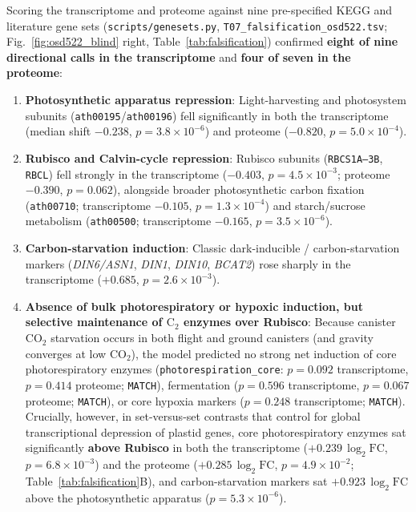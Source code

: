 \documentclass[preprint,11pt,numbers,sort&compress]{elsarticle}
\begin{document}
Scoring the transcriptome and proteome against nine pre-specified KEGG and literature gene sets (\texttt{scripts/genesets.py}, \texttt{T07\_falsification\_osd522.tsv}; Fig.~\ref{fig:osd522_blind} right, Table~\ref{tab:falsification}) confirmed \textbf{eight of nine directional calls in the transcriptome} and \textbf{four of seven in the proteome}:
\begin{enumerate}
    \item \textbf{Photosynthetic apparatus repression}: Light-harvesting and photosystem subunits (\texttt{ath00195}/\texttt{ath00196}) fell significantly in both the transcriptome (median shift $-0.238$, $p = 3.8\times 10^{-6}$) and proteome ($-0.820$, $p = 5.0\times 10^{-4}$).
    \item \textbf{Rubisco and Calvin-cycle repression}: Rubisco subunits (\texttt{RBCS1A--3B}, \texttt{RBCL}) fell strongly in the transcriptome ($-0.403$, $p = 4.5\times 10^{-3}$; proteome $-0.390$, $p = 0.062$), alongside broader photosynthetic carbon fixation (\texttt{ath00710}; transcriptome $-0.105$, $p = 1.3\times 10^{-4}$) and starch/sucrose metabolism (\texttt{ath00500}; transcriptome $-0.165$, $p = 3.5\times 10^{-6}$).
    \item \textbf{Carbon-starvation induction}: Classic dark-inducible / carbon-starvation markers (\textit{DIN6/ASN1}, \textit{DIN1}, \textit{DIN10}, \textit{BCAT2}) rose sharply in the transcriptome ($+0.685$, $p = 2.6\times 10^{-3}$).
    \item \textbf{Absence of bulk photorespiratory or hypoxic induction, but selective maintenance of $\mathrm{C_2}$ enzymes over Rubisco}: Because canister $\mathrm{CO_2}$ starvation occurs in both flight and ground canisters (and gravity converges at low $\mathrm{CO_2}$), the model predicted no strong net induction of core photorespiratory enzymes (\texttt{photorespiration\_core}: $p = 0.092$ transcriptome, $p = 0.414$ proteome; \texttt{MATCH}), fermentation ($p = 0.596$ transcriptome, $p = 0.067$ proteome; \texttt{MATCH}), or core hypoxia markers ($p = 0.248$ transcriptome; \texttt{MATCH}). Crucially, however, in set-versus-set contrasts that control for global transcriptional depression of plastid genes, core photorespiratory enzymes sat significantly \textbf{above Rubisco} in both the transcriptome ($+0.239\,\log_2\mathrm{FC}$, $p = 6.8\times 10^{-3}$) and the proteome ($+0.285\,\log_2\mathrm{FC}$, $p = 4.9\times 10^{-2}$; Table~\ref{tab:falsification}B), and carbon-starvation markers sat $+0.923\,\log_2\mathrm{FC}$ above the photosynthetic apparatus ($p = 5.3\times 10^{-6}$).
\end{enumerate}
\end{document}
